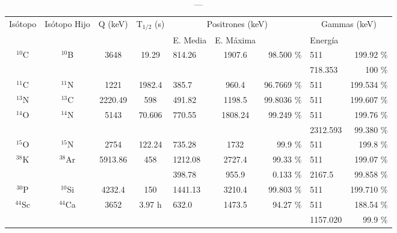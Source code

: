 \documentclass[a4paper,12pt]{report}
\begin{document}
\begin{landscape}
\begin{table}
\centering
\begin{tabular}{|c|c|c|c|lcr|lr|}
\hline
Isótopo & Isótopo Hijo & Q (keV) & T$_{1/2}$ (s) & \multicolumn{3}{c|}{Positrones (keV)}& \multicolumn{2}{c|}{Gammas (keV)} \\ 
&&&& E. Media & E. Máxima & &Energía & \\ \hline\hline
$^{10}$C & $^{10}$B & 3648 & 19.29 &  814.26 & 1907.6 &   98.500 $\%$ & 511 & 199.92 $\%$ \\ 
&&&&&&& 718.353 & 100 $\%$\\ \hline
 $^{11}$C & $^{11}$N & 1221 & 1982.4 & 385.7 & 960.4& 96.7669 $\%$ & 511 & 199.534 $\%$ \\ \hline
$^{13}$N  & $^{13}$C &2220.49 & 598 & 491.82 & 1198.5& 99.8036 $\%$ & 511 & 199.607 $\%$ \\\hline
$^{14}$O & $^{14}$N & 	5143 &  70.606 & 770.55 & 1808.24 & 99.249 $\%$ & 511 & 199.76 $\%$ \\ 
&&&&&&& 2312.593 & 99.380 $\%$ \\ \hline

 $^{15}$O & $^{15}$N & 2754 & 122.24 & 735.28 & 1732&  99.9 $\%$ & 511 & 199.8 $\%$ \\ \hline
$^{38}$K& $^{38}$Ar &5913.86 & 458 & 1212.08 & 2727.4& 99.33 $\%$ & 511 & 199.07 $\%$ \\
&&&& 398.78 & 955.9 & 0.133 $\%$ & 2167.5 & 99.858 $\%$ \\ \hline
$^{30}$P  & $^{10}$Si &4232.4 & 150 & 1441.13 & 3210.4& 99.803 $\%$ & 511 & 199.710 $\%$ \\\hline
$^{44}$Sc & $^{44}$Ca & 3652 &  3.97 h& 632.0 &  	 1473.5 &  	    94.27 $\%$ & 511 & 188.54 $\%$ \\
&&&&&&& 1157.020 &	     99.9 $\%$ \\ \hline
\end{tabular}
\label{PET-humano2}
\caption{---}
\end{table}
\end{landscape}
\end{document}
